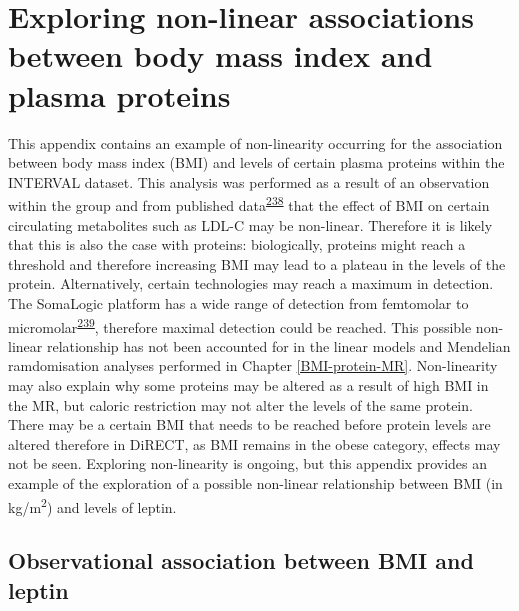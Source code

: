 \documentclass[11pt,twoside]{bristolthesis}
\begin{document}
\hypertarget{Appendix-A}{%
\chapter{Exploring non-linear associations between body mass index and plasma proteins}\label{Appendix-A}}

This appendix contains an example of non-linearity occurring for the association between body mass index (BMI) and levels of certain plasma proteins within the INTERVAL dataset. This analysis was performed as a result of an observation within the group and from published data\textsuperscript{\protect\hyperlink{ref-Li2021}{238}} that the effect of BMI on certain circulating metabolites such as LDL-C may be non-linear. Therefore it is likely that this is also the case with proteins: biologically, proteins might reach a threshold and therefore increasing BMI may lead to a plateau in the levels of the protein. Alternatively, certain technologies may reach a maximum in detection. The SomaLogic platform has a wide range of detection from femtomolar to micromolar\textsuperscript{\protect\hyperlink{ref-Lim2017}{239}}, therefore maximal detection could be reached. This possible non-linear relationship has not been accounted for in the linear models and Mendelian ramdomisation analyses performed in Chapter \ref{BMI-protein-MR}. Non-linearity may also explain why some proteins may be altered as a result of high BMI in the MR, but caloric restriction may not alter the levels of the same protein. There may be a certain BMI that needs to be reached before protein levels are altered therefore in DiRECT, as BMI remains in the obese category, effects may not be seen. Exploring non-linearity is ongoing, but this appendix provides an example of the exploration of a possible non-linear relationship between BMI (in kg/m\textsuperscript{2}) and levels of leptin.

\hypertarget{observational-association-between-bmi-and-leptin}{%
\section{Observational association between BMI and leptin}\label{observational-association-between-bmi-and-leptin}}
\end{document}
